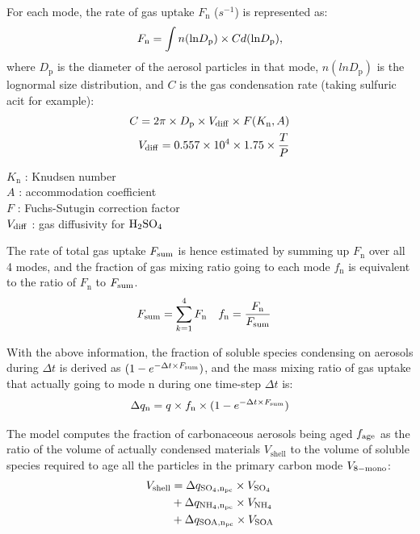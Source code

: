 \documentclass[12pt]{article}
\begin{document}
		 For each mode, the rate of gas uptake $F_\text{n}$ ($s^{-1}$) is represented as:
		 \begin{equation}
		 F_\text{n} = \int n(\text{ln}D_{\rm{p}})\times C d(\text{ln}D_\text{p}) ,
		 \end{equation}
		 where $D_\text{p}$ is the diameter of the aerosol particles in that mode, $n(lnD_\text{p})$ is the lognormal size distribution, and $C$ is the gas condensation rate (taking sulfuric acit for example):
		 \begin{align}
		 C = 2\pi \times D_\text{p} \times V_{\rm{diff}} \times F(K_\text{n}, A)\\
		 V_{\rm{diff}} = 0.557 \times 10^4 \times 1.75 \times \frac{T}{P}   
		 \end{align}
		 
		 
		 \begin{flushleft}
		 	$K_\text{n}$ : Knudsen number \\
		 	$A$ : accommodation coefficient \\
		 	$F$ : Fuchs-Sutugin correction factor \\
		 	$V_{\rm{diff}}$ : gas diffusivity for  $\rm{H_2SO_4}$
		 \end{flushleft}
		 The rate of total gas uptake $F_{\rm{sum}}$ is hence estimated by summing up $F_\text{n}$ over all 4 modes, and the fraction of gas mixing ratio going to each mode $f_\text{n}$ is equivalent to the ratio of $F_\text{n}$ to $F_{\rm{sum}}$.
		 \begin{align}
		 F_{\rm{sum}}  &= \sum_{k=1}^4 F_\text{n}          &
		 f_\text{n}          &= \frac{F_\text{n}}{F_{\rm{sum}}} 
		 \end{align}
		 
		 With the above information, the fraction of soluble species condensing on aerosols during $\Delta t$ is derived as $(1 - e^{-\Delta t\times F_{\rm{sum}}})$, and the mass mixing ratio of gas uptake that actually going to mode n during one time-step $\Delta t$ is:
		 \begin{equation}
		 \Delta q_\text{n} = q \times f_\text{n} \times (1 - e^{-\Delta t\times F_ {\rm{sum}}})
		 \end{equation}
	
		 The model computes the fraction of carbonaceous aerosols being aged $f_{\rm{age}}$ as the ratio of the volume of actually condensed materials $V_\text{shell}$ to the volume of soluble species required to age all the particles in the primary carbon mode $V_{\rm{8-mono}}$:
		 \begin{align}
		 \begin{split}
		 V_{\rm{shell}} &=  \Delta q_{\rm{SO_4}, n_{\rm{pc}}} \times V_{\rm{SO_4}} \\
		 &+ \Delta q_{\rm{NH_4}, n_{\rm{pc}}} \times V_{\rm{NH_4}} \\
		 &+ \Delta q_{\rm{SOA}, n_{\rm{pc}}} \times V_{\rm{SOA}} 
		 \end{split}
		 \end{align}
		 
\end{document}
